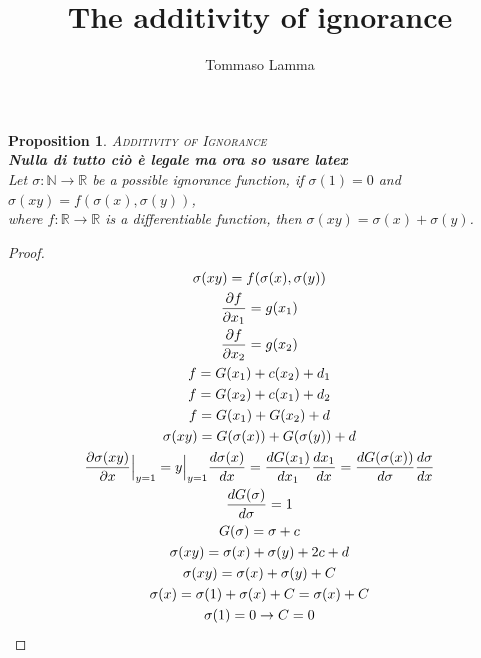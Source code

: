 \documentclass{article}
\title{The additivity of ignorance}
\author{Tommaso Lamma}
\newtheorem*{prop*}{Proposition}
\newcommand{\bb}[1]{\textbf{#1}}
\newcommand{\N}{\mathbb{N}}
\newcommand{\R}{\mathbb{R}}
\newcommand{\pder}[2]{\frac{\partial #1}{\partial #2}}
\newcommand{\eval}[1]{\Big{|}_{#1}}
\begin{document}
\maketitle
\begin{prop*}{\scshape Additivity of Ignorance\\}
\bb{Nulla di tutto ciò è legale ma ora so usare latex}\\

Let $\sigma :\N\to\R$  be a possible ignorance function, if $\sigma(1)=0$ and $\sigma(xy)=f(\sigma(x),\sigma(y))$,\\ 
where $f:\R\to\R$  is a differentiable function, then $\sigma(xy)=\sigma(x)+\sigma(y)$.
\end{prop*}
\begin{proof}
\begin{gather}
    \sigma(xy)=f(\sigma(x),\sigma(y))\\
    \pder{f}{x_1}=g(x_1)\\
    \pder{f}{x_2}=g(x_2)\\
    f=G(x_1)+c(x_2)+d_1\\
    f=G(x_2)+c(x_1)+d_2\\
    f=G(x_1)+G(x_2)+d\\
    \sigma(xy)=G(\sigma(x))+G(\sigma(y))+d\\
    \pder{\sigma(xy)}{x}\eval{y=1}=y\eval{y=1}\frac{d\sigma(x)}{dx}=\frac{dG(x_1)}{dx_1}\frac{dx_1}{dx}
        =\frac{dG(\sigma(x))}{d\sigma}\frac{d\sigma}{dx}\\
    \frac{dG(\sigma)}{d\sigma}=1\\
    G(\sigma)=\sigma+c\\
    \sigma(xy)=\sigma(x)+\sigma(y)+2c+d\\
    \sigma(xy)=\sigma(x)+\sigma(y)+C\\
    \sigma(x)=\sigma(1)+\sigma(x)+C=\sigma(x)+C\\
    \sigma(1)=0\rightarrow C=0\\
\end{gather}  
\end{proof}
\end{document}
